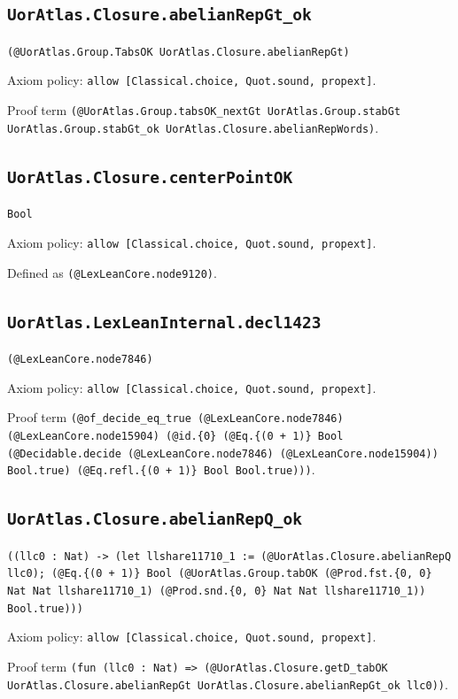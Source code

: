 \documentclass[11pt]{article}
\begin{document}
\subsection*{\texttt{UorAtlas.Closure.abelianRepGt\_ok}}
\noindent\texttt{(@UorAtlas.Group.TabsOK UorAtlas.Closure.abelianRepGt)}\par
\noindent Axiom policy: \texttt{allow [Classical.choice, Quot.sound, propext]}.\par
\noindent Proof term \texttt{(@UorAtlas.Group.tabsOK\_nextGt UorAtlas.Group.stabGt UorAtlas.Group.stabGt\_ok UorAtlas.Closure.abelianRepWords)}.\par
\subsection*{\texttt{UorAtlas.Closure.centerPointOK}}
\noindent\texttt{Bool}\par
\noindent Axiom policy: \texttt{allow [Classical.choice, Quot.sound, propext]}.\par
\noindent Defined as \texttt{(@LexLeanCore.node9120)}.\par
\subsection*{\texttt{UorAtlas.LexLeanInternal.decl1423}}
\noindent\texttt{(@LexLeanCore.node7846)}\par
\noindent Axiom policy: \texttt{allow [Classical.choice, Quot.sound, propext]}.\par
\noindent Proof term \texttt{(@of\_decide\_eq\_true (@LexLeanCore.node7846) (@LexLeanCore.node15904) (@id.\{0\} (@Eq.\{(0 + 1)\} Bool (@Decidable.decide (@LexLeanCore.node7846) (@LexLeanCore.node15904)) Bool.true) (@Eq.refl.\{(0 + 1)\} Bool Bool.true)))}.\par
\subsection*{\texttt{UorAtlas.Closure.abelianRepQ\_ok}}
\noindent\texttt{((llc0 : Nat) -> (let llshare11710\_1 := (@UorAtlas.Closure.abelianRepQ llc0); (@Eq.\{(0 + 1)\} Bool (@UorAtlas.Group.tabOK (@Prod.fst.\{0, 0\} Nat Nat llshare11710\_1) (@Prod.snd.\{0, 0\} Nat Nat llshare11710\_1)) Bool.true)))}\par
\noindent Axiom policy: \texttt{allow [Classical.choice, Quot.sound, propext]}.\par
\noindent Proof term \texttt{(fun (llc0 : Nat) => (@UorAtlas.Closure.getD\_tabOK UorAtlas.Closure.abelianRepGt UorAtlas.Closure.abelianRepGt\_ok llc0))}.\par
\end{document}
